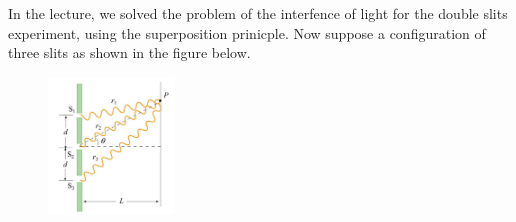 \documentclass{zc-ust-hw}
\begin{document}
\maketitle

In the lecture, we solved the problem of the interfence of light for the double
slits experiment, using the superposition prinicple. Now suppose a
configuration of three slits as shown in the figure below.

\begin{figure}[htpb]
  \begin{center}
    \includegraphics[width=0.3\textwidth]{figures/1705951832.png}
  \end{center}
  \caption{}
\end{figure}
\end{document}
